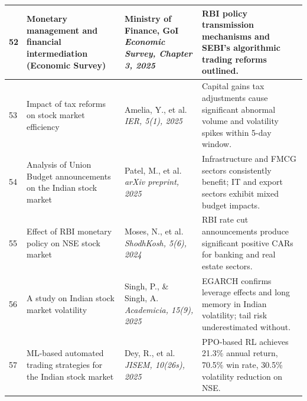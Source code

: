 \documentclass[12pt,a4paper,oneside]{report}
\theoremstyle{definition}
\theoremstyle{remark}
\begin{document}
\begin{center}
\begin{longtable}{|p{0.8cm}|p{4.2cm}|>{\raggedright\arraybackslash}p{4cm}|p{4.5cm}|}
52 & Monetary management and financial intermediation (Economic Survey) \cite{GovernmentOfIndia2025EconomicSurvey} & Ministry of Finance, GoI \newline\newline \textit{Economic Survey, Chapter 3, 2025} & RBI policy transmission mechanisms and SEBI's algorithmic trading reforms outlined. \\ \hline

53 & Impact of tax reforms on stock market efficiency \cite{Amelia2025TaxReforms} & Amelia, Y., et al. \newline\newline \textit{IER, 5(1), 2025} & Capital gains tax adjustments cause significant abnormal volume and volatility spikes within 5-day window. \\ \hline

54 & Analysis of Union Budget announcements on the Indian stock market \cite{Patel2025UnionBudget} & Patel, M., et al. \newline\newline \textit{arXiv preprint, 2025} & Infrastructure and FMCG sectors consistently benefit; IT and export sectors exhibit mixed budget impacts. \\ \hline

55 & Effect of RBI monetary policy on NSE stock market \cite{Moses2024RBIMonetary} & Moses, N., et al. \newline\newline \textit{ShodhKosh, 5(6), 2024} & RBI rate cut announcements produce significant positive CARs for banking and real estate sectors. \\ \hline

56 & A study on Indian stock market volatility \cite{Singh2025IndianVolatility} & Singh, P., \& Singh, A. \newline\newline \textit{Academicia, 15(9), 2025} & EGARCH confirms leverage effects and long memory in Indian volatility; tail risk underestimated without. \\ \hline

57 & ML-based automated trading strategies for the Indian stock market \cite{Dey2025MLTrading} & Dey, R., et al. \newline\newline \textit{JISEM, 10(26s), 2025} & PPO-based RL achieves 21.3\% annual return, 70.5\% win rate, 30.5\% volatility reduction on NSE. \\ \hline


\end{longtable}
\end{center}
\end{document}

